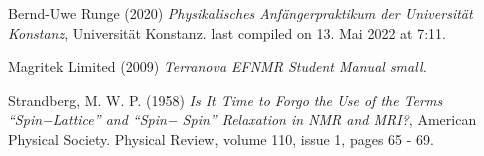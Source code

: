 \documentclass[../main.tex]{subfiles}
\begin{document}
	\begin{thebibliography}{99}
		 Bernd-Uwe Runge (2020) \emph{Physikalisches Anfängerpraktikum der Universität Konstanz}, Universität Konstanz. last compiled on 13. Mai 2022 at 7:11. 

         Magritek Limited (2009)
        \emph{Terranova EFNMR Student Manual small.}

         Strandberg, M. W. P. (1958) \emph{Is It Time to Forgo the Use of the Terms “Spin−Lattice” and “Spin− Spin” Relaxation in NMR and MRI?}, American Physical Society. Physical Review, volume 110, issue 1, pages 65 - 69. 



  
		
	\end{thebibliography}
\end{document}
